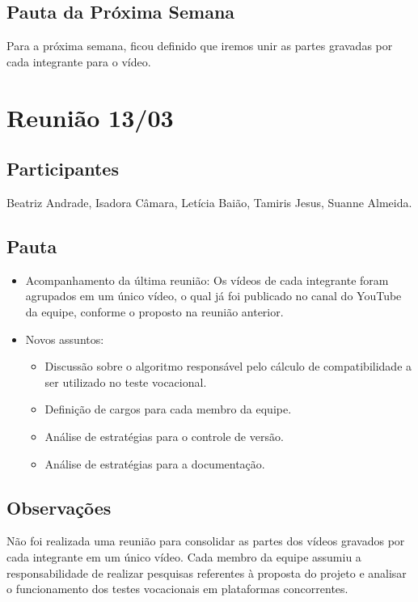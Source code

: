 \begin{apendicesenv}
\subsection*{Pauta da Próxima Semana}
Para a próxima semana, ficou definido que iremos unir as partes gravadas por cada integrante para o vídeo.

\section*{Reunião 13/03}

\subsection*{Participantes}
Beatriz Andrade, Isadora Câmara, Letícia Baião, Tamiris Jesus, Suanne Almeida.

\subsection*{Pauta}
\begin{itemize}
    \item Acompanhamento da última reunião: Os vídeos de cada integrante foram agrupados em um único vídeo, o qual já foi publicado no canal do YouTube da equipe, conforme o proposto na reunião anterior. 
    \item Novos assuntos:
    \begin{itemize}
        \item Discussão sobre o algoritmo responsável pelo cálculo de compatibilidade a ser utilizado no teste vocacional.
        \item Definição de cargos para cada membro da equipe.
        \item Análise de estratégias para o controle de versão.
        \item Análise de estratégias para a documentação.
    \end{itemize}
\end{itemize}

\subsection*{Observações}
Não foi realizada uma reunião para consolidar as partes dos vídeos gravados por cada integrante em um único vídeo.
Cada membro da equipe assumiu a responsabilidade de realizar pesquisas referentes à proposta do projeto e analisar o funcionamento dos testes vocacionais em plataformas concorrentes.


\end{apendicesenv}
